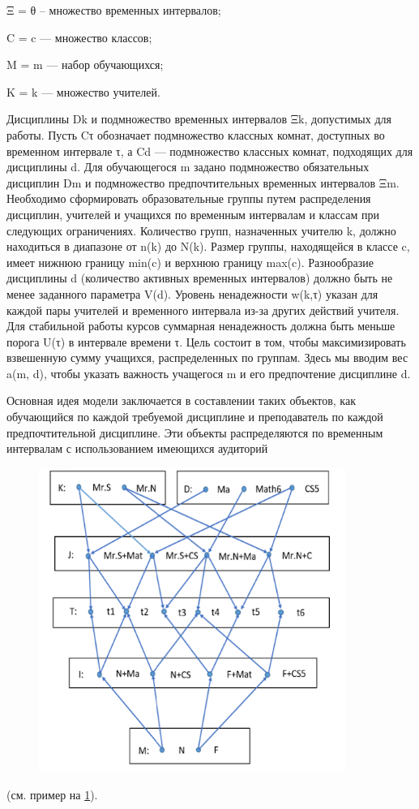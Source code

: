 Ξ = {θ} – множество временных интервалов;

C = {c} — множество классов;

M = {m} — набор обучающихся;

K = {k} — множество учителей.

Дисциплины Dk и подмножество временных интервалов Ξk, допустимых для работы. Пусть Cτ обозначает подмножество классных комнат, доступных во временном интервале τ, а Cd — подмножество классных комнат, подходящих для дисциплины d. Для обучающегося m задано подмножество обязательных дисциплин Dm и подмножество предпочтительных временных интервалов Ξm.
Необходимо сформировать образовательные группы путем распределения дисциплин, учителей и учащихся по временным интервалам и классам при следующих ограничениях. Количество групп, назначенных учителю k, должно находиться в диапазоне от n(k) до N(k). Размер группы, находящейся в классе c, имеет нижнюю границу min(c) и верхнюю границу max(c). Разнообразие дисциплины d (количество активных временных интервалов) должно быть не менее заданного параметра V(d). Уровень ненадежности w(k,τ) указан для каждой пары учителей и временного интервала из-за других действий учителя. Для стабильной работы курсов суммарная ненадежность должна быть меньше порога U(τ) в интервале времени τ. Цель состоит в том, чтобы максимизировать взвешенную сумму учащихся, распределенных по группам. Здесь мы вводим вес a(m, d), чтобы указать важность учащегося m и его предпочтение дисциплине d.

Основная идея модели заключается в составлении таких объектов, как обучающийся по каждой требуемой дисциплине и преподаватель по каждой предпочтительной дисциплине. Эти объекты распределяются по временным интервалам с использованием имеющихся аудиторий \begin{figure}[!ht]
  \centering
  \includegraphics[width=100mm]{Images/alg_1.png}
  \caption{\textbf{}}
  \label{alg1}
\end{figure} (см. пример на \ref{alg1}).


